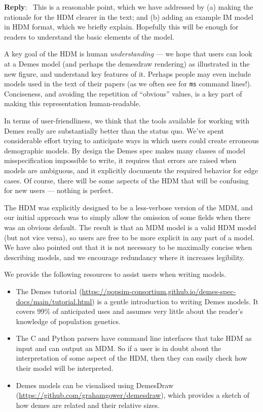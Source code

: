 \documentclass[11pt]{article}
\newcounter{reviewer}
\newcounter{point}[reviewer]
\newenvironment{reply}
   {\medskip \noindent \begin{sf}\textbf{Reply}:\  }
   {\medskip \end{sf}}
\begin{document}
\begin{reply}
This is a reasonable point, which we have addressed by
(a) making the rationale for the HDM clearer in the text; and (b) adding an
example IM model in HDM format, which we briefly explain. Hopefully
this will be enough for readers to understand the basic elements of the
model.

A key goal of the HDM is human \emph{understanding} --- we hope that
users can look at a Demes model (and perhaps the demesdraw rendering)
as illustrated in the new figure, and understand key features of it.
Perhaps people may even include models used in the text of their
papers (as we often see for \texttt{ms} command lines!).
Conciseness, and avoiding the repetition of ``obvious'' values,
is a key part of making this representation human-readable.

In terms of user-friendliness, we think that
the tools available for working with
Demes really are substantially better than the status quo.
We've spent considerable effort trying to anticipate ways in which users
could create erroneous demographic models. By design the Demes spec
makes many classes of model misspecification impossible to write,
it requires that errors are raised when models are ambiguous,
and it explicitly documents the required behavior for edge cases.
Of course, there will be some aspects of the HDM that will be
confusing for new users --- nothing is perfect.

The HDM was explicitly designed to be a less-verbose version of the MDM,
and our initial approach was to simply allow the omission of some fields
when there was an obvious default.
The result is that an MDM model is a valid HDM model (but not vice versa),
so users are free to be more explicit in any part of a model.
We have also pointed out that it is not necessary to be maximally
concise when describing models, and we encourage redundancy where
it increases legibility.

We provide the following resources to assist users when writing models.
\begin{itemize}
\item
The Demes tutorial
(\url{https://popsim-consortium.github.io/demes-spec-docs/main/tutorial.html})
is a gentle introduction to writing Demes models.
It covers 99\% of anticipated uses and assumes very little about the
reader's knowledge of population genetics.
\item
The C and Python parsers have command line interfaces that take HDM as
input and can output an MDM.
So if a user is in doubt about the interpretation of some aspect of the HDM,
then they can easily check how their model will be interpreted.
\item
Demes models can be visualised using DemesDraw
(\url{https://github.com/grahamgower/demesdraw}),
which provides a sketch of how demes are related and their relative sizes.
\end{itemize}


\end{reply}
\end{document}
